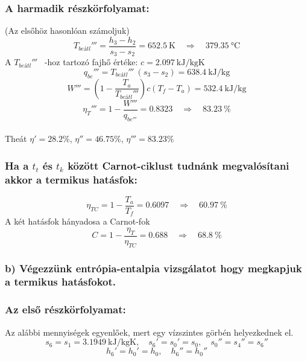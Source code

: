 \subsubsection{A harmadik részkörfolyamat:}
(Az elsőhöz hasonlóan számoljuk)
\begin{equation*}
	T_{be\textit{átl}}'''=\dfrac{h_3-h_2}{s_3-s_2}=\SI{652.5}{\kelvin}
	\quad
	\Rightarrow
	\quad
	\SI{379.35}{\celsius}	
\end{equation*}
A $T_{be\textit{átl}}'''$ \!\ -hoz tartozó fajhő értéke: 
    $c=\SI{2.097}{\kilo\joule\per\kilogram\kelvin}$
\begin{equation*}
	q_{be}'''=T_{be\textit{átl}}''' \!\ \left(s_3-s_2 \right) =\SI{638.4}{\kilo\joule\per\kilogram}
\end{equation*}
\begin{equation*}
	W'''=\left (1-\dfrac{T_a}{T_{be\textit{átl}}'''} \right) c \left(T_f-T_a \right)=\SI{532.4}{\kilo\joule\per\kilogram}	
\end{equation*}
\begin{equation*}
	\eta_T'''=1-\dfrac{W'''}{q_{be'''}}=\SI{0.8323}
	\quad
	\Rightarrow
	\quad
	\SI{83.23}{\%}	
\end{equation*}
\\Theát $\eta'={28.2}{\%}$,
$\eta''={46.75}{\%}$,
$\eta'''={83.23}{\%}$

\subsubsection{Ha a $t_t$ és $t_k$ között Carnot-ciklust tudnánk megvalósítani akkor a termikus hatásfok:}
\begin{equation*}
	\eta_{TC}=1-\dfrac{T_a}{T_f}=\SI{0.6097}
	\quad
	\Rightarrow
	\quad
	\SI{60.97}{\%}	
\end{equation*}
A két hatásfok hányadosa a Carnot-fok
\begin{equation*}
	C=1-\dfrac{\eta_T}{\eta_{TC}}=\SI{0.688}
	\quad
	\Rightarrow
	\quad
	\SI{68.8}{\%}	
\end{equation*}
 \subsubsection{b) Végezzünk entrópia-entalpia vizsgálatot hogy megkapjuk a termikus hatásfokot.}
  \subsubsection{Az első részkörfolyamat:}
  Az alábbi mennyiségek egyenlőek, mert egy vízszintes görbén helyezkednek el.
  \begin{equation*}
  	s_6=s_1=\SI{3.1949}{\kilo\joule\per\kilogram\kelvin},
  	\quad
  	s_6'=s_0'=s_0,
  	\quad
  	s_0''=s_4''=s_6''	
  \end{equation*}
   \begin{equation*}
 	h_6'=h_0'=h_0,
 	\quad
 	h_6''=h_0''
 	 \end{equation*}

